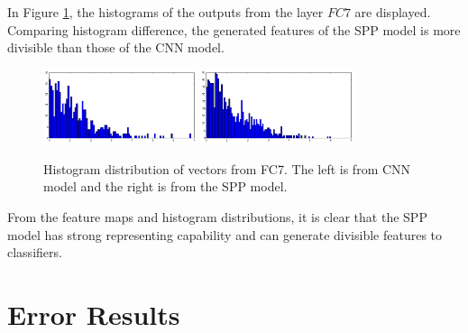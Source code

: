 In Figure \ref{fig:fc7_hist_output}, the histograms of the outputs from the layer $FC7$ are displayed. Comparing histogram difference, the generated features of the SPP model is more divisible than those of the CNN model.
\begin{figure}[htb]
    \centering
	\includegraphics[width=0.4\textwidth]{sunny2_hist_caffe_fc7.png}
	\includegraphics[width=0.4\textwidth]{sunny2_hist_spp_fc7.png}
    \caption{Histogram distribution of vectors from FC7. The left is from CNN model and the right is from the SPP model.}%
    \label{fig:fc7_hist_output}%
\end{figure}

From the feature maps and histogram distributions, it is clear that the SPP model has strong representing capability and can generate divisible features to classifiers.

\section{Error Results}

